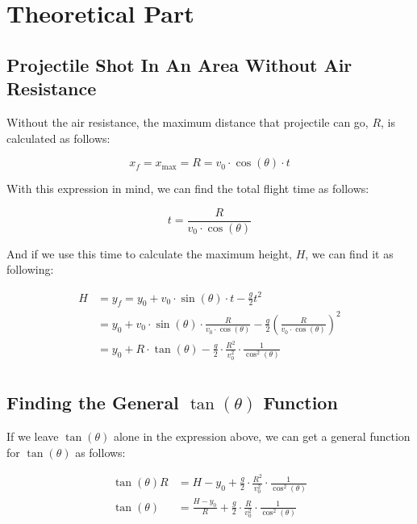 \chapter{Theoretical Part}

\section{Projectile Shot In An Area Without Air Resistance}

Without the air resistance, the maximum distance that projectile can go, $R$, is calculated as follows:

\begin{equation}
	x_f = x_{\max} = R = v_0 \cdot \cos(\theta) \cdot t
\end{equation}

With this expression in mind, we can find the total flight time as follows:

\begin{equation}
	t = \frac{R}{v_0 \cdot \cos(\theta)}
\end{equation}

And if we use this time to calculate the maximum height, $H$, we can find it as following:

\begin{equation}
	\begin{split}
		H & = y_f = y_0 + v_0 \cdot \sin(\theta) \cdot t - \frac{g}{2} t^2                                                                        \\
		  & = y_0 + v_0 \cdot \sin(\theta) \cdot \frac{R}{v_0 \cdot \cos(\theta)} - \frac{g}{2} \left( \frac{R}{v_0 \cdot \cos(\theta)} \right)^2 \\
		  & = \boxed{y_0 + R \cdot \tan(\theta) - \frac{g}{2} \cdot \frac{R^2}{v_0^2} \cdot \frac{1}{\cos^2(\theta)}}                             \\
	\end{split}
\end{equation}

\section{Finding the General $\tan (\theta)$ Function}

If we leave $\tan (\theta)$ alone in the expression above, we can get a general function for $\tan (\theta)$ as follows:

\begin{equation}
	\begin{split}
		\tan(\theta) R & = H - y_0 + \frac{g}{2} \cdot \frac{R^2}{v_0^2} \cdot \frac{1}{\cos^2(\theta)}                 \\
		\tan(\theta)   & = \boxed{\frac{H - y_0}{R} + \frac{g}{2} \cdot \frac{R}{v_0^2} \cdot \frac{1}{\cos^2(\theta)}} \\
	\end{split}
\end{equation}

